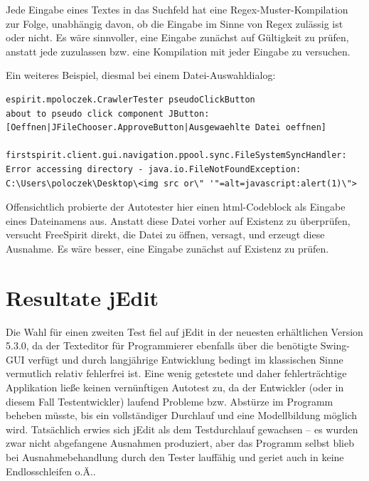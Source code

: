 Jede Eingabe eines Textes in das Suchfeld hat eine Regex-Muster-Kompilation
zur Folge, unabhängig davon, ob die Eingabe im Sinne von Regex zulässig ist
oder nicht. Es wäre sinnvoller, eine Eingabe zunächst auf Gültigkeit zu prüfen,
anstatt jede zuzulassen bzw. eine Kompilation mit jeder Eingabe zu versuchen.

Ein weiteres Beispiel, diesmal bei einem Datei-Auswahldialog:

\begin{lstlisting}[float=!ht,label=fmjson,caption={Ausnahme bei ungültiger Dateiangabe}]
espirit.mpoloczek.CrawlerTester pseudoClickButton
about to pseudo click component JButton:
[Oeffnen|JFileChooser.ApproveButton|Ausgewaehlte Datei oeffnen]

firstspirit.client.gui.navigation.ppool.sync.FileSystemSyncHandler:
Error accessing directory - java.io.FileNotFoundException:
C:\Users\poloczek\Desktop\<img src or\" '"=alt=javascript:alert(1)\">
\end{lstlisting}

Offensichtlich probierte der Autotester hier einen html-Codeblock als Eingabe eines Dateinamens
aus. Anstatt diese Datei vorher auf Existenz zu überprüfen, versucht FreeSpirit direkt,
die Datei zu öffnen, versagt, und erzeugt diese Ausnahme. Es wäre besser, eine
Eingabe zunächst auf Existenz zu prüfen.


\section{Resultate jEdit}\label{section:testresultsjedit}

Die Wahl für einen zweiten Test fiel auf jEdit
in der neuesten erhältlichen Version 5.3.0,
da der \glqq{}Texteditor für Programmierer\grqq{}
ebenfalls über die benötigte Swing-GUI verfügt und 
durch langjährige Entwicklung bedingt im klassischen
Sinne vermutlich relativ fehlerfrei ist. Eine wenig getestete und daher fehlerträchtige
Applikation ließe keinen vernünftigen Autotest zu, da der Entwickler (oder in diesem Fall
Testentwickler) laufend Probleme bzw. Abstürze im Programm beheben müsste, bis ein vollständiger
Durchlauf und eine Modellbildung möglich wird. Tatsächlich erwies sich jEdit als
dem Testdurchlauf gewachsen -- es wurden zwar nicht abgefangene Ausnahmen produziert,
aber das Programm selbst blieb bei Ausnahmebehandlung durch den Tester lauffähig
und geriet auch in keine Endlosschleifen o.Ä..


